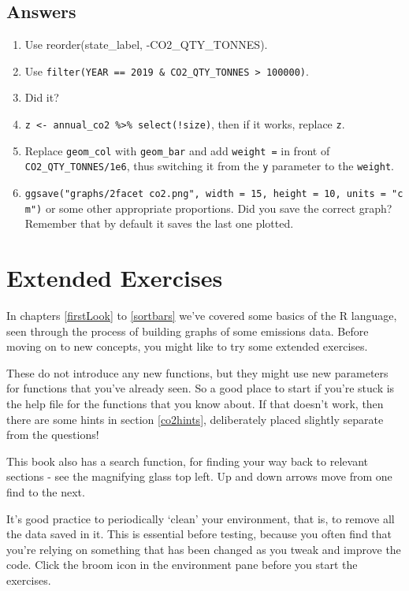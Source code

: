 \documentclass[
]{book}
\providecommand{\tightlist}{%
  \setlength{\itemsep}{0pt}\setlength{\parskip}{0pt}}
\begin{document}
\hypertarget{answers-3}{%
\subsection{Answers}\label{answers-3}}

\begin{enumerate}
\def\labelenumi{\arabic{enumi})}
\tightlist
\item
  Use reorder(state\_label, -CO2\_QTY\_TONNES).
\item
  Use \texttt{filter(YEAR\ ==\ 2019\ \&\ CO2\_QTY\_TONNES\ \textgreater{}\ 100000)}.
\item
  Did it?
\item
  \texttt{z\ \textless{}-\ annual\_co2\ \%\textgreater{}\%\ select(!size)}, then if it works, replace \texttt{z}.
\item
  Replace \texttt{geom\_col} with \texttt{geom\_bar} and add \texttt{weight\ =} in front of \texttt{CO2\_QTY\_TONNES/1e6}, thus switching it from the \texttt{y} parameter to the \texttt{weight}.
\item
  \texttt{ggsave("graphs/2facet\ co2.png",\ width\ =\ 15,\ height\ =\ 10,\ units\ =\ "cm")} or some other appropriate proportions. Did you save the correct graph? Remember that by default it saves the last one plotted.
\end{enumerate}

\hypertarget{extended-exercises}{%
\section{Extended Exercises}\label{extended-exercises}}

In chapters \ref{firstLook} to \ref{sortbars} we've covered some basics of the R language, seen through the process of building graphs of some emissions data. Before moving on to new concepts, you might like to try some extended exercises.

These do not introduce any new functions, but they might use new parameters for functions that you've already seen. So a good place to start if you're stuck is the help file for the functions that you know about. If that doesn't work, then there are some hints in section \ref{co2hints}, deliberately placed slightly separate from the questions!

This book also has a search function, for finding your way back to relevant sections - see the magnifying glass top left. Up and down arrows move from one find to the next.

It's good practice to periodically `clean' your environment, that is, to remove all the data saved in it. This is essential before testing, because you often find that you're relying on something that has been changed as you tweak and improve the code. Click the broom icon in the environment pane before you start the exercises.
\end{document}
